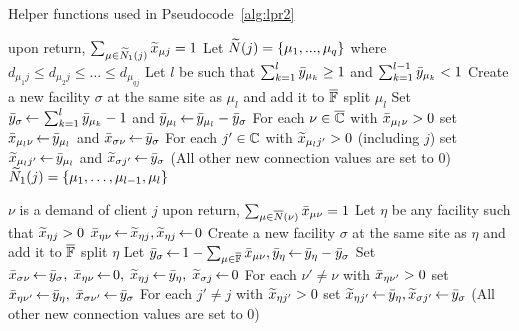 \documentclass{llncs}
\begin{document}
\begin{algorithm}[ht]
  \caption{Helper functions used in Pseudocode~\ref{alg:lpr2}}
  \label{alg:helper}
  \begin{algorithmic}[1]
						\Comment upon return, $\sum_{\mu\in{\widetilde N}_1(j)} {\widetilde x}_{\mu j} = 1$
    \State Let ${\widetilde N}(j) = \{\mu_1,...,\mu_{q}\}$ where $d_{\mu_1 j} \leq d_{\mu_2 j} \leq \ldots \leq d_{\mu_{q j}}$
    \State Let $l$ be such that $\sum_{k=1}^{l} {\bar y}_{\mu_k} \geq 1$ and $\sum_{k=1}^{l -1} {\bar y}_{\mu_{k}} < 1$
    \State Create a new facility $\sigma$ at the same site as $\mu_l$ and add it to $\overline{\mathbb{F}}$
			\Comment split $\mu_l$
    \State Set ${\bar y}_{\sigma}{\,\leftarrow\,} \sum_{k=1}^{l} {\bar y}_{\mu_{k}}-1$
					and ${\bar y}_{\mu_l} {\,\leftarrow\,} {\bar y}_{\mu_l} - {\bar y}_{\sigma}$
    \State For each $\nu\in\overline{\mathbb{C}}$ with ${\bar x}_{\mu_{l}\nu}>0$
 			set ${\bar x}_{\mu_{l}\nu} {\,\leftarrow\,} {\bar y}_{\mu_l}$ and ${\bar x}_{\sigma \nu} {\,\leftarrow\,} {\bar y}_{\sigma}$
    \State For each $j'\in\mathbb{C}$ with ${\widetilde x}_{\mu_{l} j'}>0$ (including $j$)
			set ${\widetilde x}_{\mu_l j'} {\,\leftarrow\,} {\bar y}_{\mu_l}$ and ${\widetilde x}_{\sigma j'} {\,\leftarrow\,} {\bar y}_\sigma$
	\State (All other new connection values are set to $0$)
    \State \Return ${\widetilde N}_1(j) = \{\mu_{1},\ldots,\mu_{l-1}, \mu_{l}\}$    				
    \EndFunction

    					\Comment $\nu$ is a demand of client $j$
    					\Comment upon return, $\sum_{\mu\in{\overline{N}}(\nu)} {\bar x}_{\mu\nu} = 1$
    \State Let $\eta$ be any facility such that ${\widetilde x}_{\eta j} > 0$
    \State ${\bar x}_{\eta\nu} {\,\leftarrow\,} {\widetilde x}_{\eta j}, {\widetilde x}_{\eta j} {\,\leftarrow\,} 0$
    \Else
    \State Create a new facility $\sigma$ at the same site as $\eta$ and add it to $\overline{\mathbb{F}}$
    					\Comment split $\eta$
    \State Let ${\bar y}_\sigma {\,\leftarrow\,} 1-\sum_{\mu\in \overline{\mathbb{F}}} {\bar x}_{\mu\nu}, {\bar y}_{\eta} {\,\leftarrow\,} {\bar y}_{\eta} - {\bar y}_{\sigma}$
    \State Set ${\bar x}_{\sigma\nu}{\,\leftarrow\,} {\bar y}_{\sigma},\; {\bar x}_{\eta \nu} {\,\leftarrow\,}  0,\; {\widetilde x}_{\eta j} {\,\leftarrow\,} {\bar y}_{\eta}, \; {\widetilde x}_{\sigma j} {\,\leftarrow\,} 0$
    \State For each $\nu' \neq \nu$ with ${\bar x}_{\eta \nu'}>0$ set ${\bar x}_{\eta \nu'} {\,\leftarrow\,} {\bar y}_{\eta},\; {\bar x}_{\sigma \nu'} {\,\leftarrow\,} {\bar y}_{\sigma}$
    \State For each $j' \neq j$ with ${\widetilde x}_{\eta j'}>0$ set ${\widetilde x}_{\eta j'} {\,\leftarrow\,} {\bar y}_{\eta}, {\widetilde x}_{\sigma j'} {\,\leftarrow\,} {\bar y}_{\sigma}$
	\State  (All other new connection values are set to $0$)
    \EndIf
    \EndWhile
    \EndFunction
  \end{algorithmic}
\end{algorithm}
\end{document}
